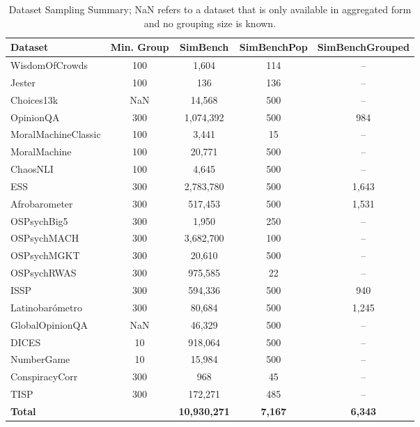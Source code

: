 \documentclass{article} %
\begin{document}
\begin{table}[ht]
\centering
\caption{Dataset Sampling Summary; NaN refers to a dataset that is only available in aggregated form and no grouping size is known.}
\label{tab:dataset_sampling_table}
\begin{tabular}{lcccc}
\toprule
\textbf{Dataset} & \textbf{Min. Group} & \textbf{SimBench} & \textbf{SimBenchPop} & \textbf{SimBenchGrouped} \\
\midrule
WisdomOfCrowds      & 100 & 1,604    & 114  & --  \\
Jester              & 100 & 136      & 136  & --  \\
Choices13k          & NaN & 14,568   & 500  & --  \\
OpinionQA           & 300 & 1,074,392& 500  & 984 \\
MoralMachineClassic & 100 & 3,441    & 15   & --  \\
MoralMachine        & 100 & 20,771   & 500  & --  \\
ChaosNLI            & 100 & 4,645    & 500  & --  \\
ESS                 & 300 & 2,783,780& 500  & 1,643 \\
Afrobarometer       & 300 & 517,453  & 500  & 1,531 \\
OSPsychBig5         & 300 & 1,950    & 250  & --  \\
OSPsychMACH         & 300 & 3,682,700& 100  & --  \\
OSPsychMGKT         & 300 & 20,610   & 500  & --  \\
OSPsychRWAS         & 300 & 975,585  & 22   & --  \\
ISSP                & 300 & 594,336  & 500  & 940 \\
Latinobarómetro     & 300 & 80,684   & 500  & 1,245 \\
GlobalOpinionQA     & NaN & 46,329   & 500  & --  \\
DICES               & 10  & 918,064  & 500  & --  \\
NumberGame          & 10  & 15,984   & 500  & --  \\
ConspiracyCorr      & 300 & 968      & 45   & --  \\
TISP                & 300 & 172,271  & 485  & --  \\
\midrule
\textbf{Total}      &      & \textbf{10,930,271}          & \textbf{7,167} & \textbf{6,343} \\
\bottomrule
\end{tabular}
\end{table}
\end{document}
